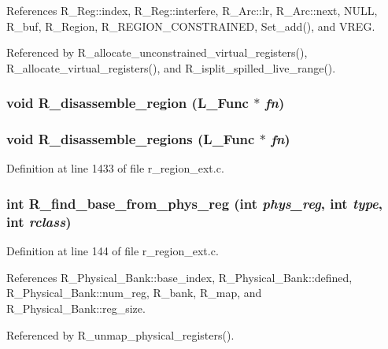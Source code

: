 References R\_\-Reg::index, R\_\-Reg::interfere, R\_\-Arc::lr, R\_\-Arc::next, NULL, R\_\-buf, R\_\-Region, R\_\-REGION\_\-CONSTRAINED, Set\_\-add(), and VREG.

Referenced by R\_\-allocate\_\-unconstrained\_\-virtual\_\-registers(), R\_\-allocate\_\-virtual\_\-registers(), and R\_\-isplit\_\-spilled\_\-live\_\-range().
\subsubsection{\setlength{\rightskip}{0pt plus 5cm}void R\_\-disassemble\_\-region (L\_\-Func $\ast$ {\em fn})}\label{r__regproto_8h_8e1b9dc5cd006ae513e5715334755e51}


\subsubsection{\setlength{\rightskip}{0pt plus 5cm}void R\_\-disassemble\_\-regions (L\_\-Func $\ast$ {\em fn})}\label{r__regproto_8h_5e2fdcfcf633ffd0a09a99d2a001f2e5}




Definition at line 1433 of file r\_\-region\_\-ext.c.
\subsubsection{\setlength{\rightskip}{0pt plus 5cm}int R\_\-find\_\-base\_\-from\_\-phys\_\-reg (int {\em phys\_\-reg}, int {\em type}, int {\em rclass})}\label{r__regproto_8h_d5319db9254920f1201b01c6012b4e77}




Definition at line 144 of file r\_\-region\_\-ext.c.

References R\_\-Physical\_\-Bank::base\_\-index, R\_\-Physical\_\-Bank::defined, R\_\-Physical\_\-Bank::num\_\-reg, R\_\-bank, R\_\-map, and R\_\-Physical\_\-Bank::reg\_\-size.

Referenced by R\_\-unmap\_\-physical\_\-registers().
